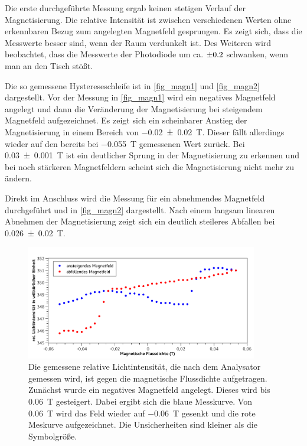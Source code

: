 \documentclass[
	a4paper,
	12pt,
	pagesize,
	ngerman
]{scrartcl}
\begin{document}
	Die erste durchgeführte Messung ergab keinen stetigen Verlauf der Magnetisierung. %
	Die relative Intensität ist zwischen verschiedenen Werten ohne erkennbaren Bezug zum angelegten Magnetfeld gesprungen.
	Es zeigt sich, dass die Messwerte besser sind, wenn der Raum verdunkelt ist. %
	Des Weiteren wird beobachtet, dass die Messwerte der Photodiode um ca. $\SI{\pm0,2}{}$ schwanken, wenn man an den Tisch stößt.

	Die so gemessene Hystereseschleife ist in \cref{fig_magn1} und \cref{fig_magn2} dargestellt.
	Vor der Messung in \cref{fig_magn1} wird ein negatives Magnetfeld angelegt und dann die Veränderung der Magnetisierung bei steigendem Magnetfeld aufgezeichnet. %
	Es zeigt sich ein scheinbarer Anstieg der Magnetisierung in einem Bereich von \SI{-0,02+-0,02}{T}. 
	Dieser fällt allerdings wieder auf den bereits bei \SI{-0,055}{T} gemessenen Wert zurück.
	Bei \SI{0,03+-0,001}{T} ist ein deutlicher Sprung in der Magnetisierung zu erkennen und bei noch stärkeren Magnetfeldern scheint sich die Magnetisierung nicht mehr zu ändern.

	Direkt im Anschluss wird die Messung für ein abnehmendes Magnetfeld durchgeführt und in \cref{fig_magn2} dargestellt.
	Nach einem langsam linearen Abnehmen der Magnetisierung zeigt sich ein deutlich steileres Abfallen bei \SI{0,026+-0,02}{T}.

	\begin{figure}[H]  %
		\includegraphics[width=0.90\textwidth]{fig_magn_licht} %
		\centering
		\caption{Die gemessene relative Lichtintensität, die nach dem Analysator gemessen wird, ist gegen die magnetische Flussdichte aufgetragen. 
		Zunächst wurde ein negatives Magnetfeld angelegt. 
		Dieses wird bis \SI{0,06}{T} gesteigert.
		Dabei ergibt sich die blaue Messkurve.
		Von \SI{0,06}{T} wird das Feld wieder auf \SI{-0,06}{T} gesenkt und die rote Meskurve aufgezeichnet.
		Die Unsicherheiten sind kleiner als die Symbolgröße.} %
		\label{fig_magn_licht}
		\centering
	\end{figure}
\end{document}

